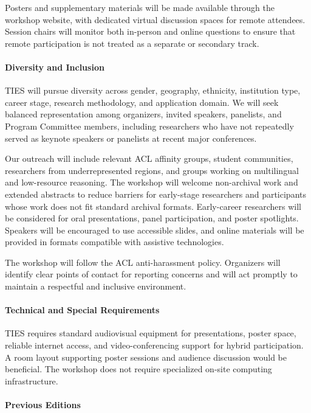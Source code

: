 \documentclass[11pt]{article}
\begin{document}
Posters and supplementary materials will be made available through the
workshop website, with dedicated virtual discussion spaces for remote
attendees. Session chairs will monitor both in-person and online
questions to ensure that remote participation is not treated as a
separate or secondary track.

\paragraph{Diversity and Inclusion}

TIES will pursue diversity across gender, geography, ethnicity,
institution type, career stage, research methodology, and application
domain. We will seek balanced representation among organizers, invited
speakers, panelists, and Program Committee members, including
researchers who have not repeatedly served as keynote speakers or
panelists at recent major conferences.

Our outreach will include relevant ACL affinity groups, student
communities, researchers from underrepresented regions, and groups
working on multilingual and low-resource reasoning. The workshop will
welcome non-archival work and extended abstracts to reduce barriers for
early-stage researchers and participants whose work does not fit
standard archival formats. Early-career researchers will be considered
for oral presentations, panel participation, and poster spotlights.
Speakers will be encouraged to use accessible slides, and online
materials will be provided in formats compatible with assistive
technologies.

The workshop will follow the ACL anti-harassment policy. Organizers will
identify clear points of contact for reporting concerns and will act
promptly to maintain a respectful and inclusive environment.

\paragraph{Technical and Special Requirements}

TIES requires standard audiovisual equipment for presentations, poster
space, reliable internet access, and video-conferencing support for
hybrid participation. A room layout supporting poster sessions and
audience discussion would be beneficial. The workshop does not require
specialized on-site computing infrastructure.

\paragraph{Previous Editions}
\end{document}
